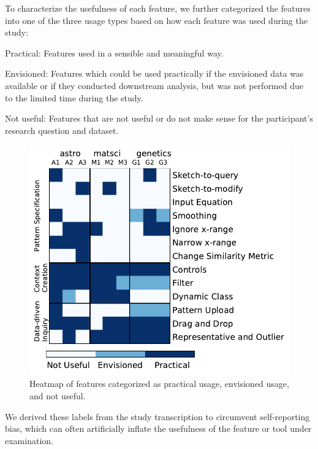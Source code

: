 To characterize the usefulness of each feature, we further categorized the features into one of the three usage types based on how each feature was used during the study:
\begin{denselist}
    \item Practical: Features used in a sensible and meaningful way.
    \item Envisioned: Features which could be used practically if the envisioned data was available or if they conducted downstream analysis, but was not performed due to the limited time during the study.
    \item Not useful: Features that are not useful or do not make sense for the participant's research question and dataset.
\end{denselist}
\begin{figure}[h!]
  \includegraphics[width=0.8\linewidth]{figures/PENcoding.pdf}
  \caption{Heatmap of features categorized as practical usage, envisioned usage, and not useful. }
  \label{fig:feature_heatmap}
\end{figure}
We derived these labels from the study transcription to circumvent self-reporting bias, which can often artificially inflate the usefulness of the feature or tool under examination.

